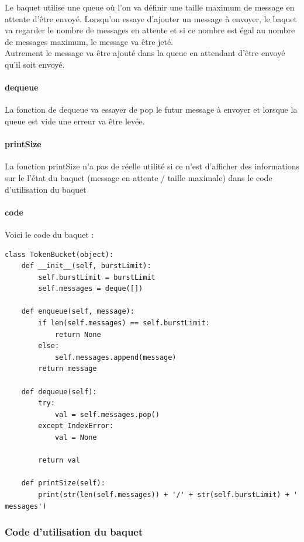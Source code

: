 \documentclass{article}
\begin{document}
Le baquet utilise une queue où l'on va définir une taille maximum de message en attente d'être envoyé. Lorsqu'on essaye d'ajouter un message à envoyer, le baquet va regarder le nombre de messages en attente et si ce nombre est égal au nombre de messages maximum, le message va être jeté.\\

Autrement le message va être ajouté dans la queue en attendant d'être envoyé qu'il soit envoyé.

\paragraph{dequeue}

La fonction de dequeue va essayer de pop le futur message à envoyer et lorsque la queue est vide une erreur va être levée.

\paragraph{printSize}

La fonction printSize n'a pas de réelle utilité si ce n'est d'afficher des informations sur le l'état du baquet (message en attente / taille maximale) dans le code d'utilisation du baquet

\paragraph{code}

Voici le code du baquet : 

\begin{lstlisting}
class TokenBucket(object):
	def __init__(self, burstLimit):
		self.burstLimit = burstLimit
		self.messages = deque([])
	
	def enqueue(self, message):
		if len(self.messages) == self.burstLimit:
			return None
		else:
			self.messages.append(message)
		return message
	
	def dequeue(self):
		try:
			val = self.messages.pop()
		except IndexError:
			val = None
		
		return val
	
	def printSize(self):
		print(str(len(self.messages)) + '/' + str(self.burstLimit) + ' messages')
\end{lstlisting}

\subsubsection{Code d'utilisation du baquet}
\end{document}
